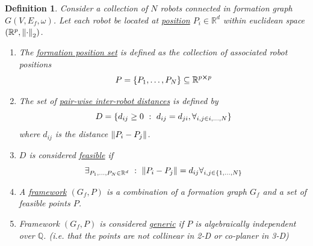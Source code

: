 \documentclass[]{article}
\numberwithin{equation}{section}
\newcommand{\R}{\mathbb{R}}
\newcommand{\Q}{\mathbb{Q}}
\newcommand{\st}{\ : \ }
\newtheorem{definition}{Definition}
\begin{document}
\begin{definition} \label{def:framework_def}
    Consider a collection of $N$ robots connected in formation graph $G(V, E_f, \omega)$.
    Let each robot be located at \emph{\underline{position}} $P_i \in \R^d$ within euclidean space $(\R^p, \norm{\cdot}_2)$.
    \begin{enumerate}
        \item The \underline{\emph{formation position set}} is defined as the collection of associated robot positions\[
            P = \qty{P_1, \dots, P_N} \subseteq \R^{p \cross p}
        \]
        \item The set of \underline{\emph{pair-wise inter-robot distances}} is defined by \[
            D = \qty{
                d_{ij} \geq 0 \st d_{ij} = d_{ji}, \forall_{i,j \in i, \dots, N}
            }
        \] where $d_{ij}$ is the distance $\norm{P_i - P_j}$.
        \item $D$ is considered \emph{\underline{feasible}} if \[
            \exists_{P_1,\dots,P_N \in \R^d} \st \norm{P_i - P_j} = d_{ij} \forall_{i, j \in \qty{1,\dots,N}}
        \]
        \item A \underline{\emph{framework}} $(G_f, P)$ is a combination of a formation graph $G_f$ and a set of feasible points $P$.
        \item Framework $(G_f, P)$ is considered \emph{\underline{generic}} if $P$ is algebraically independent over $\Q$.
        (i.e. that the points are not collinear in 2-D or co-planer in 3-D)
    \end{enumerate}
\end{definition}
\end{document}

